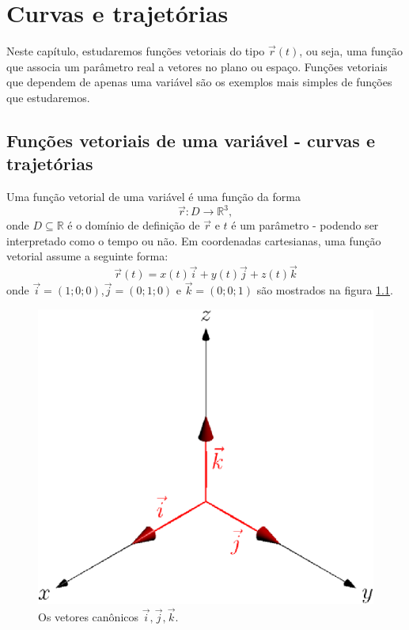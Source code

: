 
\chapter{Curvas e trajetórias}
  Neste capítulo, estudaremos funções vetoriais do tipo $\vec{r}(t)$, ou seja, uma função que associa um parâmetro real a vetores no plano ou espaço. Funções vetoriais que dependem de apenas uma variável são os exemplos mais simples de funções que estudaremos.

\section{Funções vetoriais de uma variável - curvas e trajetórias}
Uma função vetorial de uma variável é uma função da forma $$\vec{r}:D\to \mathbb{R}^3,$$ onde $D\subseteq \mathbb{R}$ é o domínio de definição de $\vec{r}$ e $t$ é um parâmetro - podendo ser interpretado como o tempo ou não. Em coordenadas cartesianas, uma função vetorial assume a seguinte forma:
$$\vec{r}(t)=x(t)\vec{i}+y(t)\vec{j}+z(t)\vec{k}$$
onde $\vec{i}=(1;0;0)$,$\vec{j}=(0;1;0)$ e $\vec{k}=(0;0;1)$ são mostrados na figura \ref{fig_vetijk}.

\begin{figure} \label{fig_vetijk}
\begin{center}
    \includegraphics{./cap_curvas/figs/vetores_ijk}
 \caption{Os vetores canônicos $\vec{i},\vec{j},\vec{k}$.}
  \end{center}
\end{figure}

